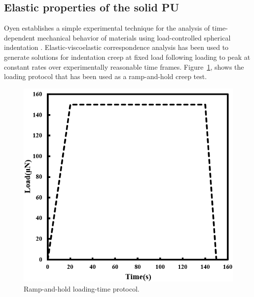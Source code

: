 \documentclass[review]{elsarticle}
\begin{document}
\subsection{Elastic properties of the solid PU}
Oyen establishes a simple experimental technique for the analysis of time-dependent mechanical behavior of materials using load-controlled spherical indentation \cite{oyen2005}. Elastic-viscoelastic correspondence analysis has been used to generate solutions for indentation creep at fixed load following loading to peak at constant rates over experimentally reasonable time frames. Figure~\ref{fig:SchematicLoadUnload}, shows the loading protocol that has been used as a ramp-and-hold creep test.  
\begin{figure}[hb]
  \centering
  \includegraphics[scale=0.6]{SchematicLoadUnload}
  \captionsetup{justification=centering}
  \caption[Close up of \textit{Hemidactylus} sp. ]
   {Ramp-and-hold loading-time protocol.}
  \label{fig:SchematicLoadUnload}
\end{figure}
\end{document}
